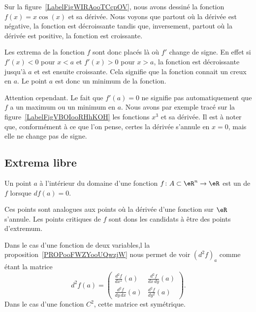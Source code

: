 Sur la figure~\ref{LabelFigWIRAooTCcpOV}, nous avons dessiné la fonction $f(x)=x\cos(x)$ et sa dérivée. Nous voyons que partout où la dérivée est négative, la fonction est décroissante tandis que, inversement, partout où la dérivée est positive, la fonction est croissante.
\newcommand{\CaptionFigWIRAooTCcpOV}{La fonction $f(x)=x\cos(x)$ en bleu et sa dérivée en rouge.}


Les extrema de la fonction $f$ sont donc placés là où $f'$ change de signe. En effet si $f'(x)<0$ pour $x<a$ et $f'(x)>0$ pour $x>a$, la fonction est décroissante jusqu'à $a$ et est ensuite croissante. Cela signifie que la fonction connait un creux en $a$. Le point $a$ est donc un minimum de la fonction.

Attention cependant. Le fait que $f'(a)=0$ ne signifie pas automatiquement que $f$ a un maximum ou un minimum en $a$. Nous avons par exemple tracé sur la figure~\ref{LabelFigVBOIooRHhKOH} les fonctions $x^3$ et sa dérivée. Il est à noter que, conformément à ce que l'on pense, certes la dérivée s'annule en $x=0$, mais elle ne change pas de signe.

\newcommand{\CaptionFigVBOIooRHhKOH}{La dérivée de $x^3$ s'annule en $x=0$, mais ce n'est ni un minimum ni un maximum.}


\subsection{Extrema libre}

\begin{definition}      \label{DEFooYJLZooLkEAYf}
Un point $a$ à l'intérieur du domaine d'une fonction $f\colon A\subset\eR^n\to \eR$ est un  de $f$ lorsque $df(a)=0$.
\end{definition}

Ces points sont analogues aux points où la dérivée d'une fonction sur $\eR$ s'annule. Les points critiques de $f$ sont dons les candidats à être des points d'extremum.

Dans le cas d'une fonction de deux variables,l la proposition~\ref{PROPooFWZYooUQwzjW} nous permet de voir \( (d^2f)_a\) comme étant la matrice
\begin{equation}
    d^2f(a)=\begin{pmatrix}
    \frac{ d^2f  }{ dx^2 }(a)   &   \frac{ d^2f  }{ dx\,dy }(a) \\
    \frac{ d^2f  }{ dy\,dx }(a)     &   \frac{ d^2f  }{ dy^2 }(a)
\end{pmatrix}.
\end{equation}
Dans le cas d'une fonction $C^2$, cette matrice est symétrique.


